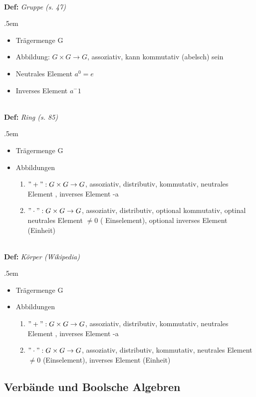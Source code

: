 \documentclass[twocolumn, 10pt]{article}
\newenvironment {definition}
                [1][]
                {\noindent\\{\bf
                Def:}\emph{
                #1}\indent\begin{addmargin}{.5em}}{\end{addmargin}}
\begin{document}
\begin{definition}[Gruppe (s. 47)]
\begin{itemize}
  \item Trägermenge G
  \item Abbildung: $G \times G \rightarrow G$, assoziativ, kann kommutativ
  (abelsch) sein
  \item Neutrales Element $a^0 = e$
  \item Inverses Element $a^-1$
\end{itemize}
\end{definition}

\begin{definition}[Ring (s. 85)]
\begin{itemize}
  \item Trägermenge G
  \item Abbildungen
  	\begin{enumerate}
    	\item $"+": G\times G \rightarrow G$, assoziativ, distributiv, kommutativ,
    	neutrales Element \grqq , inverses Element \glqq -a\grqq
    	\item $"\cdot ": G\times G \rightarrow G$, assoziativ, distributiv,
    	optional kommutativ, optinal neutrales Element $\neq 0$ (\glqq
    	Einselement\grqq ), optional inverses Element (\glqq Einheit\grqq )
  	\end{enumerate}
\end{itemize}
\end{definition}

\begin{definition}[Körper (Wikipedia)]
\begin{itemize}
  \item Trägermenge G
  \item Abbildungen
  	\begin{enumerate}
    	\item $"+": G\times G \rightarrow G$, assoziativ, distributiv, kommutativ,
    	neutrales Element \grqq, inverses Element \glqq -a\grqq
    	\item $"\cdot ": G\times G \rightarrow G$, assoziativ, distributiv,
    	kommutativ, neutrales Element $\neq 0$ (\glqq Einselement\grqq ), inverses
    	Element (\glqq Einheit\grqq )
  	\end{enumerate}
\end{itemize}
\end{definition}



\subsection*{Verbände und Boolsche Algebren}
\end{document}
